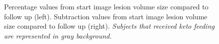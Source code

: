 \begin{figure}[!h]\vspace{-0.5cm}
    \begin{minipage}{1\textwidth}
        \centering
            \begin{minipage}{0.25\linewidth}\hspace{-3cm}
                
            \end{minipage}
            \begin{minipage}{0.25\linewidth}
                
            \end{minipage}
    \end{minipage}\vspace{-0.15cm}
   \caption{Percentage values from start image lesion volume size compared to follow up (left). Subtraction values from start image lesion volume size compared to follow up (right). \emph{Subjects that received keto feeding are represented in gray background.}}
\end{figure}



